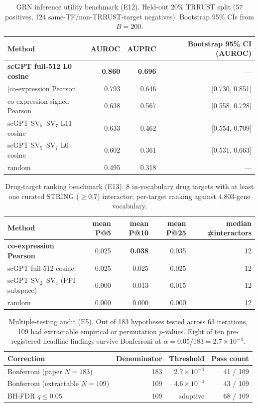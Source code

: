 \documentclass[12pt]{article}
\newcommand{\SV}[1]{\mathrm{SV}_{#1}}
\begin{document}
\begin{table}[!ht]
\centering
\caption{GRN inference utility benchmark (E12). Held-out 20\% TRRUST split (57 positives, 124 same-TF/non-TRRUST-target negatives). Bootstrap 95\% CIs from $B = 200$.}
\label{tab:grn_benchmark}
\begin{tabular}{lrrr}
\toprule
Method & AUROC & AUPRC & Bootstrap 95\% CI (AUROC) \\
\midrule
\textbf{scGPT full-512 L0 cosine} & \textbf{0.860} & \textbf{0.696} & --- \\
$\vert$co-expression Pearson$\vert$ & 0.793 & 0.646 & [0.730, 0.851] \\
co-expression signed Pearson  & 0.638 & 0.567 & [0.558, 0.728] \\
scGPT $\SV{5}$--$\SV{7}$ L11 cosine     & 0.633 & 0.462 & [0.554, 0.709] \\
scGPT $\SV{5}$--$\SV{7}$ L0 cosine      & 0.602 & 0.361 & [0.531, 0.663] \\
random                       & 0.495 & 0.318 & --- \\
\bottomrule
\end{tabular}
\end{table}

\begin{table}[!ht]
\centering
\caption{Drug-target ranking benchmark (E13). 8 in-vocabulary drug targets with at least one curated STRING ($\geq 0.7$) interactor; per-target ranking against 4{,}803-gene vocabulary.}
\label{tab:drug_targets}
\begin{tabular}{lrrrr}
\toprule
Method & mean P@5 & mean P@10 & mean P@25 & median \#interactors \\
\midrule
\textbf{co-expression Pearson} & 0.025 & \textbf{0.038} & 0.035 & 12 \\
scGPT full-512 cosine & 0.025 & 0.025 & 0.025 & 12 \\
scGPT $\SV{2}$--$\SV{4}$ (PPI subspace) & 0.000 & 0.013 & 0.015 & 12 \\
random & 0.000 & 0.000 & 0.000 & 12 \\
\bottomrule
\end{tabular}
\end{table}

\begin{table}[!ht]
\centering
\caption{Multiple-testing audit (E5). Out of 183 hypotheses tested across 63 iterations, 109 had extractable empirical or permutation $p$-values. Eight of ten pre-registered headline findings survive Bonferroni at $\alpha = 0.05/183 = 2.7 \times 10^{-4}$.}
\label{tab:multiple_testing}
\begin{tabular}{lrrr}
\toprule
Correction & Denominator & Threshold & Pass count \\
\midrule
Bonferroni (paper $N = 183$) & 183 & $2.7 \times 10^{-4}$ & 41 / 109 \\
Bonferroni (extractable $N = 109$) & 109 & $4.6 \times 10^{-4}$ & 43 / 109 \\
BH-FDR $q \leq 0.05$ & 109 & adaptive & 68 / 109 \\
\bottomrule
\end{tabular}
\end{table}
\end{document}
